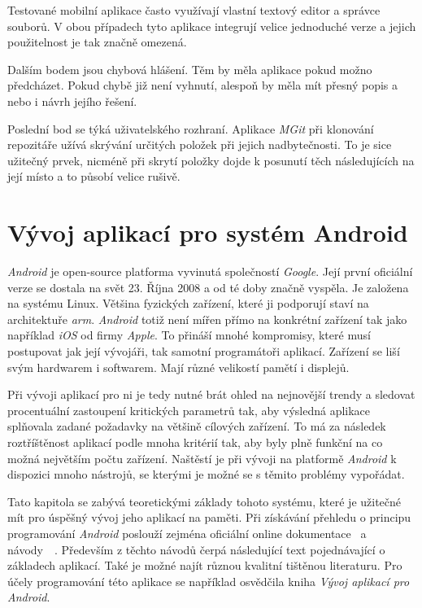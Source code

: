     Testované mobilní aplikace často využívají vlastní textový editor a správce souborů. V obou případech tyto aplikace integrují velice jednoduché verze a jejich použitelnost je tak značně omezená.

    Dalším bodem jsou chybová hlášení. Těm by měla aplikace pokud možno předcházet. Pokud chybě již není vyhnutí, alespoň by měla mít přesný popis a nebo i návrh jejího řešení.

    Poslední bod se týká uživatelského rozhraní. Aplikace \emph{MGit} při klonování repozitáře užívá skrývání určitých položek při jejich nadbytečnosti. To je sice užitečný prvek, nicméně při skrytí položky dojde k posunutí těch následujících na její místo a to působí velice rušivě.

\chapter{Vývoj aplikací pro systém Android}
\emph{Android} je open-source platforma vyvinutá společností \emph{Google}. Její první oficiální verze se dostala na svět 23. Října 2008 a od té doby značně vyspěla. Je založena na systému Linux. Většina fyzických zařízení, které ji podporují staví na architektuře \emph{arm}. \emph{Android} totiž není mířen přímo na konkrétní zařízení tak jako například \emph{iOS} od firmy \emph{Apple}. To přináší mnohé kompromisy, které musí postupovat jak její vývojáři, tak samotní programátoři aplikací. Zařízení se liší svým hardwarem i softwarem. Mají různé velikostí pamětí i displejů.

Při vývoji aplikací pro ni je tedy nutné brát ohled na nejnovější trendy a sledovat procentuální zastoupení kritických parametrů tak, aby výsledná aplikace splňovala zadané požadavky na většině cílových zařízení. To má za následek roztříštěnost aplikací podle mnoha kritérií tak, aby byly plně funkční na co možná největším počtu zařízení. Naštěstí je při vývoji na platformě \emph{Android} k dispozici mnoho nástrojů, se kterými je možné se s těmito problémy vypořádat.

Tato kapitola se zabývá teoretickými základy tohoto systému, které je užitečné mít pro úspěšný vývoj jeho aplikací na paměti. Při získávání přehledu o principu programování \emph{Android} poslouží zejména oficiální online dokumentace~ a návody~~. Především z těchto návodů čerpá následující text pojednávající o základech aplikací. Také je možné najít různou kvalitní tištěnou literaturu. Pro účely programování této aplikace se například osvědčila kniha \emph{Vývoj aplikací pro Android}\cite{android-Lacko}.

